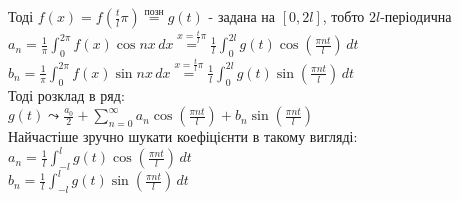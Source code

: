 \documentclass[a4paper, 10pt]{article}
\def\hugespace{\vspace{5mm} \\}
\theoremstyle{theoremdd}
\theoremstyle{theoremdd}
\theoremstyle{theoremdd}
\theoremstyle{theoremdd}
\theoremstyle{theoremdd}
\theoremstyle{theoremdd}
\theoremstyle{theoremdd}
\theoremstyle{theoremdd}
\begin{document}
Тоді $\displaystyle f(x) = f(\frac{t}{l}\pi) \overset{\textrm{позн}}{=} g(t)$ - задана на $[0, 2l]$, тобто $2l$-періодична\\
$\displaystyle a_n = \frac{1}{\pi}\int_0^{2\pi} f(x) \cos nx \,dx \overset{\displaystyle x = \frac{t}{l} \pi}{=} \frac{1}{l} \int_0^{2l} g(t) \cos \left( \frac{\pi n t}{l} \right) \,dt$\\
$\displaystyle b_n = \frac{1}{\pi}\int_0^{2\pi} f(x) \sin nx \,dx \overset{\displaystyle x = \frac{t}{l} \pi}{=} \frac{1}{l} \int_0^{2l} g(t) \sin \left( \frac{\pi n t}{l} \right) \,dt$\\
Тоді розклад в ряд:\\
$\displaystyle g(t) \leadsto \displaystyle \frac{a_0}{2} + \sum_{n=0}^{\infty} a_n \cos \left( \frac{\pi n t}{l} \right) + b_n \sin \left( \frac{\pi n t}{l} \right)$\\
Найчастіше зручно шукати коефіцієнти в такому вигляді:\\
$\displaystyle a_n = \frac{1}{l} \int_{-l}^{l} g(t) \cos \left( \frac{\pi n t}{l} \right) \,dt$\\
$\displaystyle b_n = \frac{1}{l} \int_{-l}^{l} g(t) \sin \left( \frac{\pi n t}{l} \right) \,dt$
\hugespace
\end{document}
